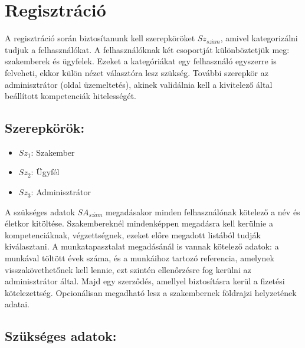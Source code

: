 \section{Regisztráció}


A regisztráció során biztosítanunk kell szerepköröket ${Sz}_{sz\acute{a}m}$, amivel kategorizálni tudjuk a felhasználókat. A felhasználóknak két csoportját különböztetjük meg: szakemberek és ügyfelek. Ezeket a kategóriákat egy felhasználó egyszerre is felveheti, ekkor külön nézet választóra lesz szükség. További szerepkör az adminisztrátor (oldal üzemeltetés), akinek validálnia kell a kivitelező által beállított kompetenciák hitelességét.

\subsection{Szerepkörök:}

\begin{itemize}
    \item ${Sz}_1$: Szakember
    \item ${Sz}_2$: Ügyfél
    \item ${Sz}_3$: Adminisztrátor
\end{itemize}

A szükséges adatok ${SA}_{sz\acute{a}m}$ megadásakor minden felhasználónak kötelező a név és életkor kitöltése. Szakembereknél mindenképpen megadásra kell kerülnie a kompetenciáknak, végzettségnek, ezeket előre megadott listából tudják kiválasztani. A munkatapasztalat megadásánál is vannak kötelező adatok: a munkával töltött évek száma, és a munkáihoz tartozó referencia, amelynek visszakövethetőnek kell lennie, ezt szintén ellenőrzésre fog kerülni az adminisztrátor által. Majd egy szerződés, amellyel biztosításra kerül a fizetési kötelezettség. Opcionálisan megadható lesz a szakembernek földrajzi helyzetének adatai.

\subsection{Szükséges adatok:}

